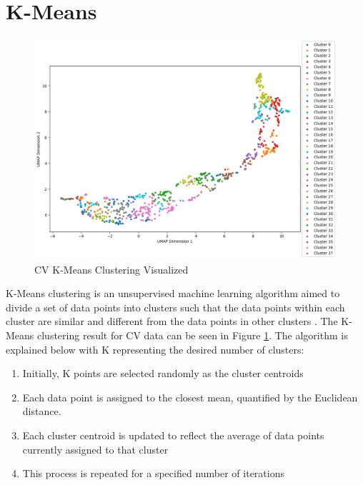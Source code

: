 \section{K-Means}
\begin{figure}[h!]
  \centering
    \includegraphics[width=1.0\textwidth]{figures/k-means.png}
    \caption{CV K-Means Clustering Visualized}
    \label{kmeans}
\end{figure}
K-Means clustering is an unsupervised machine learning algorithm aimed to divide a set of data points into clusters such that the data points within each cluster are similar and different from the data points in other clusters \cite{MacQueen1967}. The K-Means clustering result for CV data can be seen in Figure \ref{kmeans}. The algorithm is explained below with K representing the desired number of clusters:
\begin{enumerate}
    \item Initially, K points are selected randomly as the cluster centroids
    \item Each data point is assigned to the closest mean, quantified by the Euclidean distance. 
    \item Each cluster centroid is updated to reflect the average of data points currently assigned to that cluster 
    \item This process is repeated for a specified number of iterations
\end{enumerate}

